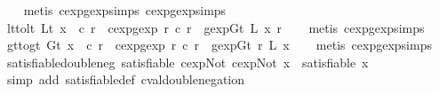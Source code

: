 \begin{isabellebody}
%
\isadelimproof
\ \ %
\endisadelimproof
%
\isatagproof
{}\isamarkupfalse%
\ {\isacharparenleft}metis\ cexp{}gexp{\isachardot}simps{\isacharparenleft}{}{\isacharparenright}\ cexp{}gexp{\isachardot}simps{\isacharparenleft}{}{\isacharparenright}{\isacharparenright}%
\endisatagproof
{\isafoldproof}%
%
\isadelimproof
\isanewline
%
\endisadelimproof
\isanewline
{}\isamarkupfalse%
\ lt{\isacharunderscore}to{\isacharunderscore}lt{\isacharcolon}\ {\isachardoublequoteopen}Lt\ x\ {\isacharequal}\ c\ r\ {\isasymLongrightarrow}\ {\isacharparenleft}cexp{}gexp\ r\ {\isacharparenleft}c\ r{\isacharparenright}{\isacharparenright}\ {\isacharequal}\ gexp{\isachardot}Gt\ {\isacharparenleft}L\ x{\isacharparenright}\ r{\isachardoublequoteclose}\isanewline
%
\isadelimproof
\ \ %
\endisadelimproof
%
\isatagproof
{}\isamarkupfalse%
\ {\isacharparenleft}metis\ cexp{}gexp{\isachardot}simps{\isacharparenleft}{}{\isacharparenright}{\isacharparenright}%
\endisatagproof
{\isafoldproof}%
%
\isadelimproof
\isanewline
%
\endisadelimproof
\isanewline
{}\isamarkupfalse%
\ gt{\isacharunderscore}to{\isacharunderscore}gt{\isacharcolon}\ {\isachardoublequoteopen}Gt\ x\ {\isacharequal}\ c\ r\ {\isasymLongrightarrow}\ {\isacharparenleft}cexp{}gexp\ r\ {\isacharparenleft}c\ r{\isacharparenright}{\isacharparenright}\ {\isacharequal}\ gexp{\isachardot}Gt\ r\ {\isacharparenleft}L\ x{\isacharparenright}{\isachardoublequoteclose}\isanewline
%
\isadelimproof
\ \ %
\endisadelimproof
%
\isatagproof
{}\isamarkupfalse%
\ {\isacharparenleft}metis\ cexp{}gexp{\isachardot}simps{\isacharparenleft}{}{\isacharparenright}{\isacharparenright}%
\endisatagproof
{\isafoldproof}%
%
\isadelimproof
\isanewline
%
\endisadelimproof
\isanewline
{}\isamarkupfalse%
\ satisfiable{\isacharunderscore}double{\isacharunderscore}neg{\isacharcolon}\ {\isachardoublequoteopen}satisfiable\ {\isacharparenleft}cexp{\isachardot}Not\ {\isacharparenleft}cexp{\isachardot}Not\ x{\isacharparenright}{\isacharparenright}\ {\isacharequal}\ satisfiable\ x{\isachardoublequoteclose}\isanewline
%
\isadelimproof
\ \ %
\endisadelimproof
%
\isatagproof
{}\isamarkupfalse%
\ {\isacharparenleft}simp\ add{\isacharcolon}\ satisfiable{\isacharunderscore}def\ cval{\isacharunderscore}double{\isacharunderscore}negation{\isacharparenright}%
\endisatagproof
{\isafoldproof}%
%
\isadelimproof
\isanewline
%
\endisadelimproof
\isanewline
{}\isamarkupfalse%

\end{isabellebody}
